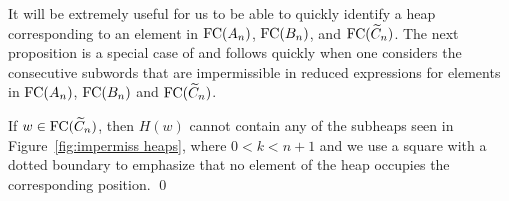 It will be extremely useful for us to be able to quickly identify a heap corresponding to an element in $\mathrm{FC}(A_n)$, $\mathrm{FC}(B_n)$, and $\mathrm{FC}(\widetilde{C}_n)$. The next proposition is a special case of \cite[Proposition 3.3]{Stembridge1996} and follows quickly when one considers the consecutive subwords that are impermissible in reduced expressions for elements in $\mathrm{FC}(A_n)$, $\mathrm{FC}(B_n)$ and $\mathrm{FC}(\widetilde{C}_n)$.

\begin{theorem}
If $w \in \mathrm{FC}(\widetilde{C}_n)$, then $H(w)$ cannot contain any of the subheaps seen in Figure~\ref{fig:impermiss heaps}, where $0 < k < n+1$ and we use a square with a dotted boundary to emphasize that no element of the heap occupies the corresponding  position. \qed
\end{theorem}

